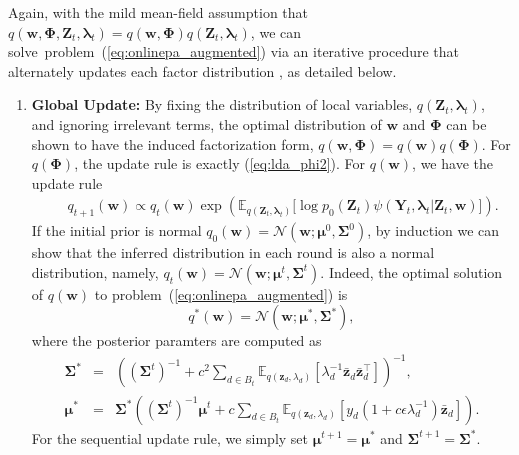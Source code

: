 \documentclass[twoside,11pt]{article}
\newcommand{\Yv}{\bm{Y}}
\newcommand{\zv}{\bm{z}}
\newcommand{\Zv}{\bm{Z}}
\newcommand{\wv}{\bm{w}}
\newcommand{\Phiv}{\bm{\Phi}}
\newcommand{\muv}{\bm \mu}
\newcommand{\lambdav}{\bm \lambda}
\newcommand{\Sigmav}{\bm \Sigma}
\newcommand{\ep}{\mathbb{E}}
\begin{document}
Again, with the mild mean-field assumption that $q(\wv,\Phiv, \Zv_t, \lambdav_t) = q(\wv, \Phiv) q(\Zv_t, \lambdav_t)$, we can solve~problem~(\ref{eq:onlinepa_augmented}) via an iterative procedure that alternately updates each factor distribution \citep{jordan1998introduction}, as detailed below.
\begin{enumerate}
\item {\bf Global Update:} By fixing the distribution of local variables, $q(\Zv_t, \lambdav_t)$, and ignoring irrelevant terms, the optimal distribution of $\wv$ and $\Phiv$ can be shown to have the induced factorization form, $q(\wv, \Phiv) = q(\wv) q(\Phiv)$. For $q(\Phiv)$, the update rule is exactly (\ref{eq:lda_phi2}). For $q(\wv)$, we have the update rule
\setlength\arraycolsep{0pt} \begin{eqnarray}
&& q_{t+1}(\bm{w}) \propto  q_t(\wv) \exp\left(\ep_{q(\Zv_t,\lambdav_t)}\Big[\log p_0(\Zv_t) \psi( \Yv_t , \lambdav_t | \Zv_t, \wv) \Big] \right) . \label{eq:lda_weight} \nonumber
\end{eqnarray}
If the initial prior is normal $q_0(\wv) = \mathcal{N}(\wv; \muv^0, \Sigmav^0)$, by induction we can show that the inferred distribution in each round is also a normal distribution, namely, $q_t(\wv) = \mathcal{N}(\wv; \muv^t, \Sigmav^t)$. Indeed, the optimal solution of $q(\wv)$ to problem~(\ref{eq:onlinepa_augmented}) is
\setlength\arraycolsep{1pt} \begin{equation}\label{eq:lda_weight2}
q^*(\wv) = \mathcal{N}(\bm{w}; \bm{\mu}^*, \Sigmav^*),
\end{equation}
where the posterior paramters are computed as
\begin{eqnarray*}
\Sigmav^*  &=& \left( (\Sigmav^t)^{-1} + c^2 \sum_{d \in B_t}\ep_{q(\zv_d,\lambda_d)}\left[ \lambda_d^{-1} \bar{\zv}_d \bar{\zv}_d^\top \right] \right)^{-1}, \\
\muv^* &=& \Sigmav^* \left( (\Sigmav^t)^{-1} \muv^t + c\sum_{d \in B_t}\ep_{q(\zv_d, \lambda_d)}\left[ y_d \left( 1 + c\epsilon \lambda_d^{-1} \right) \bar{\zv}_d \right] \right).
\end{eqnarray*}
For the sequential update rule, we simply set $\muv^{t+1} = \muv^*$ and $\Sigmav^{t+1} = \Sigmav^*$.


\end{enumerate}
\end{document}
